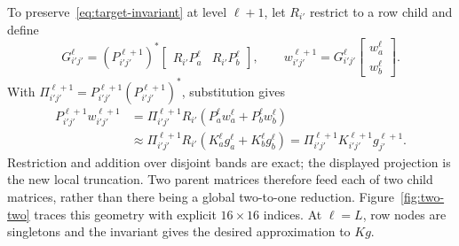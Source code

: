 \documentclass[11pt,a4paper]{article}
\begin{document}
To preserve~\eqref{eq:target-invariant} at level $\ell+1$, let $R_{i'}$ restrict to a row child and define
\begin{equation}
 G_{i'j'}^\ell=(P_{i'j'}^{\ell+1})^*
 \begin{bmatrix}R_{i'}P_a^\ell&R_{i'}P_b^\ell\end{bmatrix},
 \qquad
 w_{i'j'}^{\ell+1}=G_{i'j'}^\ell
 \begin{bmatrix}w_a^\ell\\w_b^\ell\end{bmatrix}.
 \label{eq:target-transfer}
\end{equation}
With $\Pi_{i'j'}^{\ell+1}=P_{i'j'}^{\ell+1}(P_{i'j'}^{\ell+1})^*$, substitution gives
\begin{align}
 P_{i'j'}^{\ell+1}w_{i'j'}^{\ell+1}
 &=\Pi_{i'j'}^{\ell+1}R_{i'}(P_a^\ell w_a^\ell+P_b^\ell w_b^\ell)\\
 &\approx\Pi_{i'j'}^{\ell+1}R_{i'}(K_a^\ell g_a^\ell+K_b^\ell g_b^\ell)
 =\Pi_{i'j'}^{\ell+1}K_{i'j'}^{\ell+1}g_{j'}^{\ell+1}.
 \label{eq:target-proof}
\end{align}
Restriction and addition over disjoint bands are exact; the displayed projection is the new local truncation. Two parent matrices therefore feed each of two child matrices, rather than there being a global two-to-one reduction. Figure~\ref{fig:two-two} traces this geometry with explicit $16\times16$ indices. At $\ell=L$, row nodes are singletons and the invariant gives the desired approximation to $Kg$.
\end{document}
